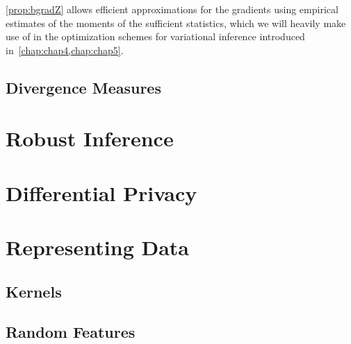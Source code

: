 \cref{prop:bgradZ} allows efficient approximations for the gradients using empirical estimates of the moments of the sufficient statistics, which we will heavily make use of in the optimization schemes for variational inference introduced in~\cref{chap:chap4,chap:chap5}.


\subsection{Divergence Measures}
\label{subsec:b-divergences}

\section{Robust Inference}
\label{sec:b-robust-inference}

\section{Differential Privacy}
\label{sec:b-differential-privacy}

\section{Representing Data}
\label{sec:b-representing-data}

\subsection{Kernels}
\label{subsec:b-kernels}

\subsection{Random Features}
\label{subsec:b-random-features}






